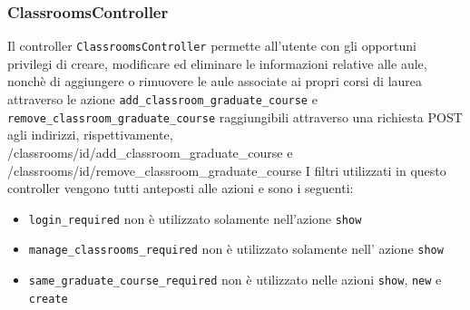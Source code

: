\documentclass[11pt,a4paper]{article}
\begin{document}
\subsubsection{ClassroomsController}
Il controller \verb|ClassroomsController| permette all'utente con gli opportuni privilegi di creare, modificare ed eliminare le informazioni relative alle aule, nonchè di aggiungere o rimuovere le aule associate ai propri corsi di laurea attraverso le azione \verb|add_classroom_graduate_course| e \\ \verb|remove_classroom_graduate_course| raggiungibili attraverso una richiesta POST agli indirizzi, rispettivamente,\\ /classrooms/id/add\_classroom\_graduate\_course e \\ /classrooms/id/remove\_classroom\_graduate\_course
I filtri utilizzati in questo controller vengono tutti anteposti alle azioni e sono i seguenti:
\begin{itemize}
 \item \verb|login_required| non è utilizzato solamente nell'azione \verb|show|
 \item \verb|manage_classrooms_required| non è utilizzato solamente nell' azione \verb|show|
 \item \verb|same_graduate_course_required| non è utilizzato nelle azioni \verb|show|, \verb|new| e \verb|create|
\end{itemize}
\end{document}
